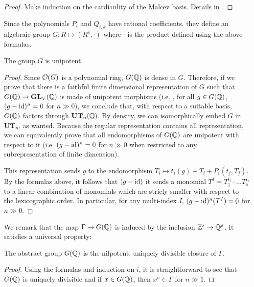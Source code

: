 \begin{proof}
Make induction on the cardianlity of the Malcev basis. Details in \cite[Propri\'et\'e 3.1.5]{suisse}.
\end{proof}

Since the polynomials $P_{i}$ and $Q_{i,k}$ have rational coefficients, they define an algebraic group $G: R\mapsto (R^s,\cdot)$ where $\cdot$ is the product defined using the above formulas. 

\begin{prop}
The group $G$ is unipotent.
\end{prop}

\begin{proof}
Since $\mathcal{O}(G)$ is a polynomial ring, $G(\mathbb{Q})$ is dense in $G$. Therefore, if we prove that there is a faithful finite dimensional representation of $G$ such that $G(\mathbb{Q})\to\mathbf{GL}_{V}(\mathbb{Q})$ is made of unipotent morphisms (i.e. , for all $g\in G(\mathbb{Q})$, $(g-\mathrm{id})^n=0$ for $n\gg0$), we conclude that, with respect to a suitable basis, $G(\mathbb{Q})$ factors through $\mathbf{UT}_n(\mathbb{Q})$. By density, we can isomorphically embed $G$ in $\mathbf{UT}_n$, as wanted. Because the regular representation contains all representation, we can equivalently prove that all endomorphisms of $G(\mathbb{Q})$ are unipotent with respect to it (i.e. $(g-\mathrm{id})^n=0$ for $n\gg0$ when restricted to any subrepresentation of finite dimension).

This representation sends $g$ to the endomorphism $T_i\mapsto t_i(g)+T_i+P_i(t_j,T_j)$. By the formulas above, it follows that $(g-\mathrm{id})$ it sends a monomial $T^I=T_1^{i_1}\cdot\ldots T_s^{i_s}$ to a linear combination of monomials which are stricly smaller with respect to the lexicographic order. In particular, for any multi-index $I$, $(g-\mathrm{id})^n(T^I)=0$ for $n\gg0$. 
\end{proof}

We remark that the map $\Gamma\to G(\mathbb{Q})$ is induced by the inclusion $\mathbb{Z}^s\to\mathbb{Q}^s$. It satisfies a universal property:

\begin{prop}
The abstract group $G(\mathbb{Q})$ is the nilpotent, uniquely divisible closure of $\Gamma$.
\end{prop}

\begin{proof}
Using the formulas and induction on $i$, it is straightforward to see that $G(\mathbb{Q})$ is uniquely divisible and if $x\in G(\mathbb{Q})$, then $x^n\in\Gamma$ for $n\gg1$.
\end{proof}

